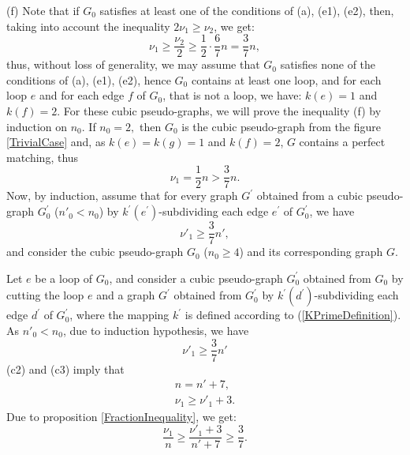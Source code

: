 \documentclass[fleqn,12pt,twoside]{article}
\newenvironment{proof}[1][Proof.]{\begin{trivlist}
\item[\hskip \labelsep {\bfseries #1}]}{\end{trivlist}}
\begin{document}
\begin{proof}
(f) Note that if $G_{0}$ satisfies at least one of the conditions of
(a), (e1), (e2), then, taking into account the inequality $2\nu
_{1}\geq \nu _{2}$, we get:
\begin{equation*}
\nu _{1}\geq \frac{\nu _{2}}{2}\geq \frac{1}{2}\cdot \frac{6}{7}n =\frac{3}{7}n,
\end{equation*}thus, without loss of generality, we may assume that $G_{0}$
satisfies none of the conditions of (a), (e1), (e2), hence $G_{0}$
contains at least one loop, and for each loop $e$ and for each edge
$f$ of $G_{0}$, that is not a loop, we have: $k(e)=1$ and $k(f)=2$.
For these cubic pseudo-graphs, we will prove the inequality (f) by
induction on $n_0$. If $n_0=2,$ then $G_{0}$ is the cubic
pseudo-graph from the figure \ref{TrivialCase} and, as $k(e)=k(g)=1$ and $k(f)=2$, $G$ contains a perfect matching, thus\begin{equation*}
\nu _{1}=\frac{1}{2}n >\frac{3}{7}n.
\end{equation*}Now, by induction, assume that for every graph $G^{\prime }$
obtained from a cubic pseudo-graph $G_{0}^{\prime }$ ($n'_0 <n_0$)
by $k^{\prime }(e^{\prime }) $-subdividing each edge $e^{\prime }$
of $G_{0}^{\prime }$, we have
\begin{equation*}
\nu' _{1}\geq \frac{3}{7}n',
\end{equation*}and consider the cubic pseudo-graph $G_{0}$ ($n_0 \geq 4$) and its
corresponding graph $G$.

Let $e$ be a loop of $G_{0}$, and consider a cubic pseudo-graph $G_{0}^{\prime }$ obtained from $G_{0}$ by cutting the loop $e$ and a graph $G^{\prime }$ obtained from $G_{0}^{\prime }$ by $k^{\prime }(d^{\prime })$-subdividing each edge $d^{\prime }$ of $G_{0}^{\prime }$, where the
mapping $k^{\prime }$ is defined according to
(\ref{KPrimeDefinition}). As $n'_0 < n_0$, due to induction
hypothesis, we have
\begin{equation*}
\nu' _{1}\geq \frac{3}{7}n'
\end{equation*}(c2) and (c3) imply that\begin{gather*}
n=n'+7,
\\
\nu _{1}\geq \nu' _{1}+3.
\end{gather*}Due to proposition \ref{FractionInequality}, we get:
\begin{equation*}
\frac{\nu _{1}}{n}\geq \frac{\nu' _{1}+3}{n'+7}\geq \frac{3}{7}.
\end{equation*}


\end{proof}
\end{document}
